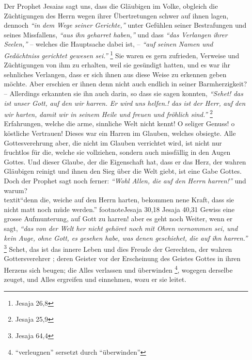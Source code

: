 Der Prophet Jesaias sagt uns, dass die Gläubigen im Volke, obgleich die
Züchtigungen des Herrn wegen ihrer Übertretungen schwer auf ihnen lagen,
dennoch
\textit{"`in dem Wege seiner Gerichte,"'} unter Gefühlen seiner Bestrafungen und
seines Missfallens, \textit{"`aus ihn geharret haben,"'} und dass \textit{"`das
Verlangen ihrer Seelen,"'} -- welches die Hauptsache dabei ist, --
\textit{"`auf seinen Namen und Gedächtniss gerichtet gewesen sei."'}
\footnote{Jesaja 26,8}
Sie waren es gern
zufrieden, Verweise und Züchtigungen von ihm zu erhalten, weil sie gesündigt
hatten, und es war ihr sehnliches Verlangen, dass er sich ihnen aus diese Weise
zu erkennen geben möchte. Aber erschien er ihnen denn
nicht auch endlich in
seiner Barmherzigkeit?  -- Allerdings erkannten sie ihn auch darin, so dass sie
sagen konnten,
\textit{"`Sehet! das ist unser Gott, auf den wir harren. Er wird uns
helfen.! das ist der Herr, auf den wir harten, damit wir in seinem Heile und
freuen und fröhlich sind."'}
\footnote{Jesaja 25,9}
Erfahrungen, welche die arme,
sinnliche Welt nicht kennt!  O seliger Genuss! o köstliche
Vertrauen! Dieses war
ein Harren im Glauben, welches obsiegte. Alle Gottesverehrung aber, die nicht im
Glauben verrichtet wird, ist nicht nur fruchtlos  für die, welche sie vollziehen,
sondern auch missfällig in den Augen Gottes. Und dieser Glaube, der die
Eigenschaft hat, dass er das Herz, der wahren Gläubigen reinigt und ihnen den
Sieg über die Welt giebt, ist eine Gabe Gottes. Doch
der Prophet sagt noch
ferner:
\textit{"`Wohl Allen, die auf den Herrn harren!"'} und warum?\\textit{"`denn
die, weiche
auf den Herrn harten, bekommen nene Kraft, dass sie nicht matt noch müde
werden."'}
footnote{Jesaja 30,18 Jesaja 40,31}
Gewiss eine grosse Aufmunterung, auf Gott
zu harren! aber es geht noch Weiter, wenn er sagt,
\textit{"`das von der Welt her
nicht gehöret noch mit Ohren vernommen sei, und kein Auge, ohne Gott, es gesehen
habe, was denen geschiehet, die auf ihn harren."'}
\footnote{Jesaja 64,4}
Sehet, das ist das innere Leben und dies Freude der Gerechten, der wahren
Gottersverehrer ;
deren Geister vor der Erscheinung des Geistes Gottes in ihren Herzens sich
beugen; die Alles verlassen und überwinden \footnote{"`verleugnen"' sersetzt
durch "`überwinden"'}, wogegen derselbe zeuget, und Alles
ergreifen und einnehmen, wozu er sie leitet.

